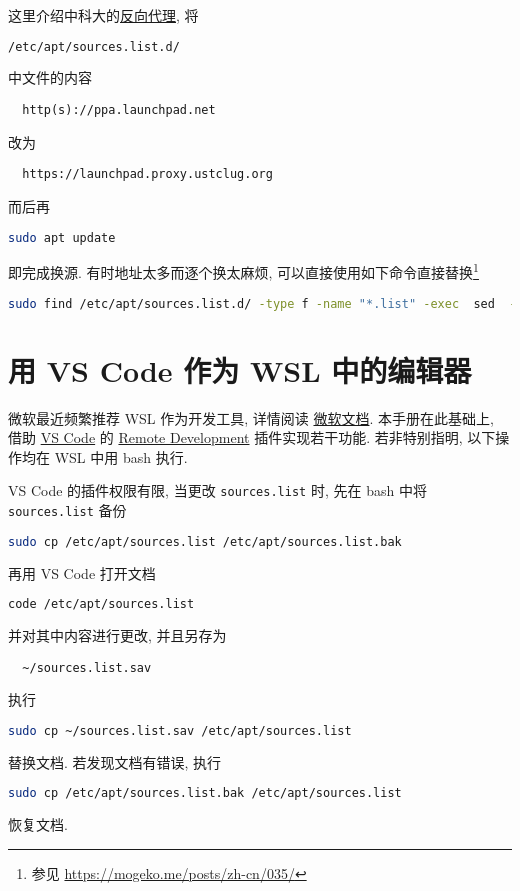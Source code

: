 这里介绍中科大的\href{https://mirrors.ustc.edu.cn/}{反向代理},
将
\begin{lstlisting}[language = bash]
  /etc/apt/sources.list.d/
\end{lstlisting}
中文件的内容
\begin{lstlisting}
  http(s)://ppa.launchpad.net
\end{lstlisting}
改为
\begin{lstlisting}
  https://launchpad.proxy.ustclug.org
\end{lstlisting}
而后再
\begin{lstlisting}[language = bash]
  sudo apt update
\end{lstlisting}
即完成换源.
有时地址太多而逐个换太麻烦,
可以直接使用如下命令直接替换\footnote{参见 \url{https://mogeko.me/posts/zh-cn/035/}}
\begin{lstlisting}[language = bash]
  sudo find /etc/apt/sources.list.d/ -type f -name "*.list" -exec  sed  -i.bak -r  's#deb(-src)?\s*http(s)?://ppa.launchpad.net#deb\1 https\2://launchpad.proxy.ustclug.org#ig' {} \;
\end{lstlisting}

\section{用 VS Code 作为 WSL 中的编辑器}\label{sec:addition:wsl-editor}

微软最近频繁推荐 WSL 作为开发工具,
详情阅读%
\href{https://learn.microsoft.com/zh-cn/windows/wsl/tutorials/wsl-vscode}{微软文档}.
本手册在此基础上,
借助 \href{https://code.visualstudio.com/download}{VS Code} 的 \href{https://marketplace.visualstudio.com/items?itemName=ms-vscode-remote.vscode-remote-extensionpack}{Remote Development}
插件实现若干功能.
若非特别指明,
以下操作均在 WSL 中用 \textsf{bash} 执行.

VS Code 的插件权限有限,
当更改 \texttt{sources.list} 时,
先在 \textsf{bash} 中将 \texttt{sources.list} 备份
\begin{lstlisting}[language=bash]
  sudo cp /etc/apt/sources.list /etc/apt/sources.list.bak
\end{lstlisting}
再用 VS Code 打开文档
\begin{lstlisting}[language=bash]
  code /etc/apt/sources.list
\end{lstlisting}
并对其中内容进行更改,
并且另存为
\begin{lstlisting}
  ~/sources.list.sav
\end{lstlisting}
执行
\begin{lstlisting}[language=bash]
  sudo cp ~/sources.list.sav /etc/apt/sources.list
\end{lstlisting}
替换文档.
若发现文档有错误,
执行
\begin{lstlisting}[language=bash]
  sudo cp /etc/apt/sources.list.bak /etc/apt/sources.list
\end{lstlisting}
恢复文档.

